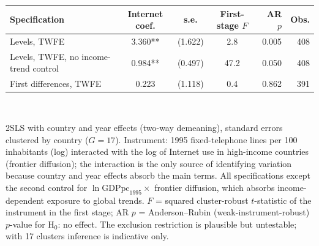 \begin{tabular}{lcccrr}\toprule
Specification & Internet coef. & s.e. & First-stage $F$ & AR $p$ & Obs. \\
\midrule
Levels, TWFE & 3.360** & (1.622) & 2.8 & 0.005 & 408 \\
Levels, TWFE, no income-trend control & 0.984** & (0.497) & 47.2 & 0.050 & 408 \\
First differences, TWFE & 0.223 & (1.118) & 0.4 & 0.862 & 391 \\
\bottomrule\end{tabular}
\\[3pt]\begin{minipage}{\tablewidth}\footnotesize 2SLS with country and year effects (two-way demeaning), standard errors clustered by country ($G=17$). Instrument: 1995 fixed-telephone lines per 100 inhabitants (log) interacted with the log of Internet use in high-income countries (frontier diffusion); the interaction is the only source of identifying variation because country and year effects absorb the main terms. All specifications except the second control for $\ln \mathrm{GDPpc}_{1995}\times$ frontier diffusion, which absorbs income-dependent exposure to global trends. $F$ = squared cluster-robust $t$-statistic of the instrument in the first stage; AR $p$ = Anderson--Rubin (weak-instrument-robust) $p$-value for H$_0$: no effect. The exclusion restriction is plausible but untestable; with 17 clusters inference is indicative only.\end{minipage}
